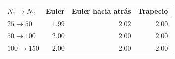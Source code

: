 \begin{tabular}{l r r r}
\toprule
\rowcolor{Azul1!50}
$N_1\to N_2$ & Euler & Euler hacia atrás & Trapecio \\
\midrule
$25\to50$ & $1.99$ & $2.02$ & $2.00$ \\
$50\to100$ & $2.00$ & $2.00$ & $2.00$ \\
$100\to150$ & $2.00$ & $2.00$ & $2.00$ \\
\bottomrule
\end{tabular}
